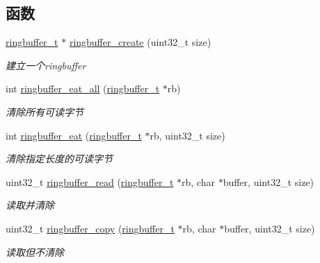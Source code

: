 \subsection*{函数}
\begin{DoxyCompactItemize}
\item 
\hyperlink{a00051_af929c5cf86b6a0f64dde407dfe60482e_af929c5cf86b6a0f64dde407dfe60482e}{ringbuffer\+\_\+t} $\ast$ \hyperlink{a00084_a535c5ed96efcd2415e6cad1cfcf44228_a535c5ed96efcd2415e6cad1cfcf44228}{ringbuffer\+\_\+create} (uint32\+\_\+t size)
\begin{DoxyCompactList}\small\item\em 建立一个ringbuffer \end{DoxyCompactList}\item 
int \hyperlink{a00084_a9af8341a5cc83cc1d6acbb868c498a03_a9af8341a5cc83cc1d6acbb868c498a03}{ringbuffer\+\_\+eat\+\_\+all} (\hyperlink{a00051_af929c5cf86b6a0f64dde407dfe60482e_af929c5cf86b6a0f64dde407dfe60482e}{ringbuffer\+\_\+t} $\ast$rb)
\begin{DoxyCompactList}\small\item\em 清除所有可读字节 \end{DoxyCompactList}\item 
int \hyperlink{a00084_aaab3eabc3d26998d7ec5458e89781b1d_aaab3eabc3d26998d7ec5458e89781b1d}{ringbuffer\+\_\+eat} (\hyperlink{a00051_af929c5cf86b6a0f64dde407dfe60482e_af929c5cf86b6a0f64dde407dfe60482e}{ringbuffer\+\_\+t} $\ast$rb, uint32\+\_\+t size)
\begin{DoxyCompactList}\small\item\em 清除指定长度的可读字节 \end{DoxyCompactList}\item 
uint32\+\_\+t \hyperlink{a00084_a93296c953b97b465aa6d878d7ddaff87_a93296c953b97b465aa6d878d7ddaff87}{ringbuffer\+\_\+read} (\hyperlink{a00051_af929c5cf86b6a0f64dde407dfe60482e_af929c5cf86b6a0f64dde407dfe60482e}{ringbuffer\+\_\+t} $\ast$rb, char $\ast$buffer, uint32\+\_\+t size)
\begin{DoxyCompactList}\small\item\em 读取并清除 \end{DoxyCompactList}\item 
uint32\+\_\+t \hyperlink{a00084_a0b57361c8632557fc144c7f7b853a33e_a0b57361c8632557fc144c7f7b853a33e}{ringbuffer\+\_\+copy} (\hyperlink{a00051_af929c5cf86b6a0f64dde407dfe60482e_af929c5cf86b6a0f64dde407dfe60482e}{ringbuffer\+\_\+t} $\ast$rb, char $\ast$buffer, uint32\+\_\+t size)
\begin{DoxyCompactList}\small\item\em 读取但不清除 \end{DoxyCompactList}\item 

\end{DoxyCompactItemize}
